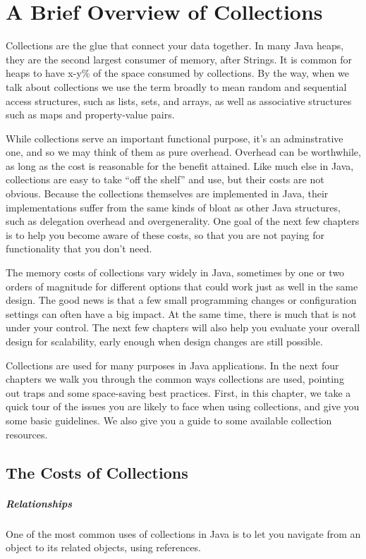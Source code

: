\chapter{A Brief Overview of Collections}
Collections are the glue that connect your data together. In
many Java heaps, they are the second largest consumer of memory, after Strings. 
It is common for heaps to have x-y\% of the space consumed by collections.  By the way, when we talk about
collections we use the term broadly to mean random and sequential
access structures, such as lists, sets, and arrays, as well as associative
structures such as maps and property-value pairs.

While collections serve an important functional purpose, it's an
adminstrative one, and so we may think of them as pure overhead.
Overhead can be worthwhile, as long as the cost is reasonable
for the benefit attained. Like much else in Java, collections are easy to take ``off the shelf'' and use, but
their costs are not obvious. Because the collections themselves are
implemented in Java, their implementations suffer from the same kinds of bloat
as other Java structures, such as delegation
overhead and overgenerality. One goal of the next few chapters is to help you
become aware of these costs, so that you are not paying for
functionality that you don't need.

The memory costs of collections vary widely in Java, sometimes by one or
two orders of magnitude for different options that could work just as well in
the same design.  %
The good news is that a few small programming
changes or configuration settings can often have a big impact. At the same
time, there is much that is not under your control. The next few
chapters will also help you evaluate your overall design for scalability, early
enough when design changes are still possible.

Collections are used for many purposes in Java applications. In the
next four chapters we walk you through the common ways collections are used,
pointing out traps and some space-saving best practices. First, in this
chapter, we take a quick tour of the issues you are likely to face when
using collections, and give you some basic guidelines. We also give you a guide to
some available collection resources.

\section{The Costs of Collections}
\paragraph{Relationships}  One of the most common uses of collections in Java is
to let you navigate from an object to its related objects, using references.
